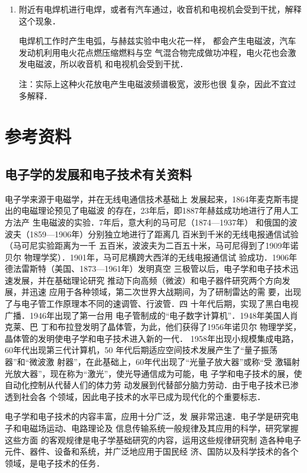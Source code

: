 \begin{enumerate}
	\item 附近有电焊机进行电焊，或者有汽车通过，收音机和电视机会受到干扰，解释这个现象．

    \begin{solution}
    电焊机工作时产生电弧，与赫兹实验中电火花一样，
都会产生电磁波，汽车发动机利用电火花点燃压缩燃料与空
气混合物完成做功冲程，电火花也会激发电磁波，所以收音机
和电视机会受到干扰．

注：实际上这种火花放电产生电磁波频谱极宽，波形也很
复杂，因此不宜过多解释．
    \end{solution}
\end{enumerate}


\section{参考资料}
\subsection{电子学的发展和电子技术有关资料}

电子学来源于电磁学，并在无线电通信技术基础上
发展起来，1864年麦克斯韦提出的电磁理论预见了电磁波
的存在，23年后，即1887年赫兹成功地进行了用人工方法产
生电磁波的实验．7年后，意大利的马可尼（1874—1937年）
和俄国的波波夫（1859—1906年）分别独立地进行了距离几
百米到千米的无线电报通信试验（马可尼实验距离为一千
五百米，波波夫为二百五十米，马可尼得到了1909年诺贝尔
物理学奖）．1901年，马可尼横跨大西洋的无线电报通信试
验成功．1906年德法雷斯特（美国、1873—1961年）发明真空
三极管以后，电子学和电子技术迅速发展，并在基础理论研究
推动下向高频（微波）和电子器件研究两个方向发展，并迅速
应用于各种领域，第二次世界大战期间，为了研制雷达的需
要，出现了与电子管工作原理本不同的速调管、行波管．四
十年代后期，实现了黑白电视广播．1946年出现了第一台用
电子管制成的“电子数字计算机”．1948年美国人肖克莱、巴
丁和布拉登发明了晶体管，为此，他们获得了1956年诺贝尔
物理学奖，晶体管的发明使电子学和电子技术进入新的一代．
1958年出现小规模集成电路，60年代出现第三代计算机，50
年代后期适应空间技术发展产生了“量子振荡器”和“微波激
射器”，在此基础上，60年代出现了“光量子放大器”或称“受
激辐射光放大器”，现在称为“激光”，使光导通信成为可能，电
子学和电子技术的展，使自动化控制从代替人们的体力劳
动发展到代替部分脑力劳动．由于电子技术已渗透到社会各
个领域，因此电子技术的水平已成为现代化的个重要标志．

电子学和电子技术的内容丰富，应用十分广泛，发
展非常迅速．电子学是研究电子和电磁场运动、电路理论及
信息传输系统一般规律及其应用的科学，研究掌握这些方面
的客观规律是电子学基础研究的内容，运用这些规律研究制
造各种电子元件、器件、设备和系统，并广泛地应用于国民经
济、国防以及科学技术的各个领域，是电子技术的任务．


